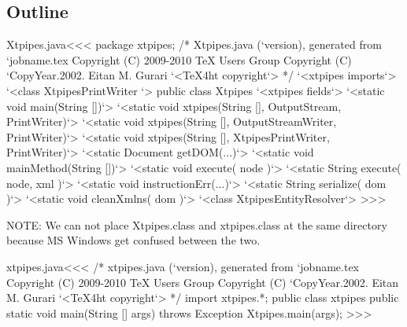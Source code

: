 \documentclass{article}
\begin{document}
{%
\subsection{Outline}




 {}{
}


 {
    \def\BIN{}
}{
    \def\BIN{(\XTPIPES)}
}

% 
%

\<Xtpipes.java\><<<
package xtpipes;
/* Xtpipes.java (`version), generated from `jobname.tex
   Copyright (C) 2009-2010 TeX Users Group
   Copyright (C) `CopyYear.2002. Eitan M. Gurari
`<TeX4ht copyright`> */
`<xtpipes imports`>
`<class XtpipesPrintWriter  `>
public class Xtpipes {
   `<xtpipes fields`>
   `<static void main(String [])`>
   `<static void xtpipes(String [], OutputStream, PrintWriter)`>
   `<static void xtpipes(String [], OutputStreamWriter, PrintWriter)`>
   `<static void xtpipes(String [], XtpipesPrintWriter, PrintWriter)`>
   `<static Document getDOM(...)`>
   `<static void mainMethod(String [])`>
   `<static void execute( node )`>
   `<static String execute( node, xml )`>
   `<static void instructionErr(...)`>
   `<static String serialize( dom )`>
   `<static void cleanXmlns( dom )`>
}
`<class XtpipesEntityResolver`>
>>>

NOTE: We can not place Xtpipes.class and xtpipes.class at the same
directory because MS Windows get confused between the two.


\<xtpipes.java\><<<
/* xtpipes.java (`version), generated from `jobname.tex
   Copyright (C) 2009-2010 TeX Users Group
   Copyright (C) `CopyYear.2002. Eitan M. Gurari
`<TeX4ht copyright`> */
import xtpipes.*;
public class xtpipes {
  public static void main(String [] args) throws Exception {
    Xtpipes.main(args);
} }
>>>


}
\end{document}
